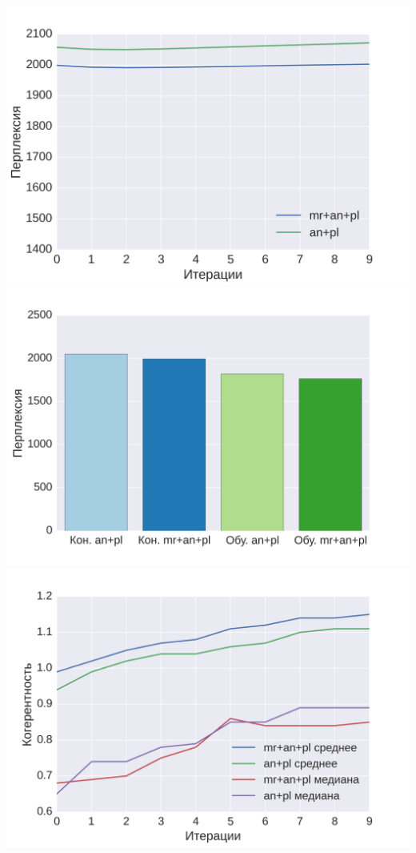 \documentclass[a4paper, 14pt]{extarticle}
\begin{document}
\includegraphics[scale=0.43]{img/no/1}
\includegraphics[scale=0.43]{img/no/5}\\
\includegraphics[scale=0.43]{img/no/3}
\end{document}
